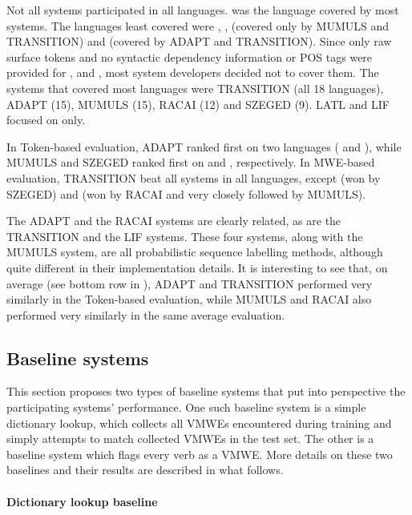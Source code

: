 \documentclass[output=paper
,modfonts
,nonflat,draftmode]{langsci/langscibook}
\begin{document}
Not all systems participated in all languages.  was the language covered by most systems. The languages least covered were , ,  (covered only by MUMULS and TRANSITION) and  (covered by ADAPT and TRANSITION). Since only raw surface tokens and no syntactic dependency information or POS tags were provided for ,  and , most system developers decided not to cover them. The systems that covered most languages were TRANSITION (all 18 languages), ADAPT (15), MUMULS (15), RACAI (12) and SZEGED (9). LATL and LIF focused on  only. 

In Token-based evaluation, ADAPT ranked first on two languages ( and ), while MUMULS and SZEGED ranked first on  and , respectively. In MWE-based evaluation, TRANSITION beat all systems in all languages, except  (won by SZEGED) and  (won by RACAI and very closely followed by MUMULS).

The ADAPT and the RACAI systems are clearly related, as are the TRANSITION and the LIF systems. These four systems, along with the MUMULS system, are all probabilistic sequence labelling methods, although quite different in their implementation details. It is interesting to see that, on average (see bottom row in ), ADAPT and TRANSITION performed very similarly in the Token-based evaluation, while MUMULS and RACAI also performed very similarly in the same average evaluation. 



\subsection{\label{sec:baselines}Baseline systems}

This section proposes two types of baseline systems that put into perspective the participating systems' performance. One such baseline system is a simple dictionary lookup, which collects all VMWEs encountered during training and simply attempts to match collected VMWEs in the test set. The other is a baseline system which flags every verb as a VMWE. More details on these two baselines and their results are described in what follows. 

\paragraph*{Dictionary lookup baseline}
\end{document}

